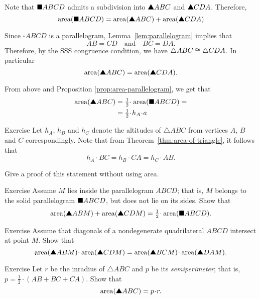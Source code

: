 Note that $\blacksquare ABCD$ admits a subdivision into $\solidtriangle ABC$ and $\solidtriangle CDA$.
Therefore, 
\[\area(\solidsquare ABCD)
=
\area(\solidtriangle ABC)
+
\area(\solidtriangle CDA)\]

Since $\square ABCD$ is a parallelogram,  Lemma~\ref{lem:parallelogram} implies that
\[AB=CD
\quad
\text{and}
\quad
BC=DA.\]
Therefore, by the SSS congruence condition, we have
$\triangle ABC\z\cong\triangle CDA$.
In particular
\[\area(\solidtriangle ABC)
=
\area(\solidtriangle CDA).\]

From above and Proposition \ref{prop:area-parallelogram}, we get that
\begin{align*}
\area(\solidtriangle ABC)
&=\tfrac12\cdot\area(\solidsquare ABCD)=
\\
&=\tfrac12\cdot h_A\cdot a
\end{align*}
\qedsf

\begin{thm}{Exercise}\label{ex:three-trig}
Let $h_A$, $h_B$ and $h_C$ denote the altitudes of $\triangle ABC$ from vertices $A$, $B$ and $C$ correspondingly.
Note that from Theorem~\ref{thm:area-of-triangle},
it follows that
\[h_A\cdot BC=h_B\cdot CA=h_C\cdot AB.\]

Give a proof of this statement without using area.
\end{thm}

\begin{thm}{Exercise}\label{ex:half-parallelogram}
Assume $M$ lies inside the parallelogram $ABCD$;
that is, $M$ belongs to the solid parallelogram $\blacksquare ABCD$, but does not lie on its sides.
Show that
\[\area(\solidtriangle ABM)+\area(\solidtriangle CDM)
=\tfrac12\cdot \area(\solidsquare ABCD).\]
\end{thm}


\begin{thm}{Exercise}\label{ex:area-diag}
Assume that diagonals 
of a nondegenerate quadrilateral $ABCD$ 
intersect at point $M$.
Show that 
\[\area(\solidtriangle ABM)\cdot\area(\solidtriangle CDM)
=
\area(\solidtriangle BCM)\cdot\area(\solidtriangle DAM).\]
 
\end{thm}

\begin{thm}{Exercise}\label{ex:area-inradius}
Let $r$ be the inradius of $\triangle ABC$
and $p$ be its {}\emph{semiperimeter}; 
that is, $p=\tfrac12\cdot(AB+BC+CA)$.
Show that
\[\area(\solidtriangle ABC)=p\cdot r.\]

\end{thm}

